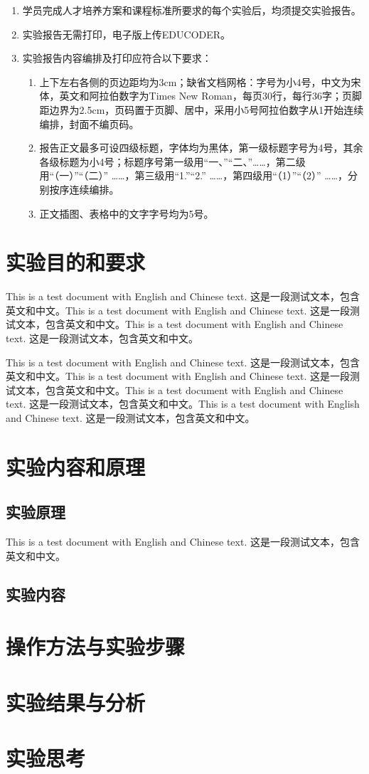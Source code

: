 \documentclass[a4paper,12pt]{article}
\begin{document}
\begin{enumerate}
\songti{}
\item 学员完成人才培养方案和课程标准所要求的每个实验后，均须提交实验报告。
\item 实验报告无需打印，电子版上传EDUCODER。
\item 实验报告内容编排及打印应符合以下要求：
    \begin{enumerate}
    \fangsong{}
    \item 上下左右各侧的页边距均为3cm；缺省文档网格：字号为小4号，中文为宋体，英文和阿拉伯数字为Times New Roman，每页30行，每行36字；页脚距边界为2.5cm，页码置于页脚、居中，采用小5号阿拉伯数字从1开始连续编排，封面不编页码。
    \item 报告正文最多可设四级标题，字体均为黑体，第一级标题字号为4号，其余各级标题为小4号；标题序号第一级用“一、”“二、”……，第二级用“（一）”“（二）” ……，第三级用“1.”“2.” ……，第四级用“（1）”“（2）” ……，分别按序连续编排。
    \item 正文插图、表格中的文字字号均为5号。
    \end{enumerate}
\end{enumerate}

\newpage

\section{实验目的和要求}
This is a test document with English and Chinese text. 这是一段测试文本，包含英文和中文。This is a test document with English and Chinese text. 这是一段测试文本，包含英文和中文。This is a test document with English and Chinese text. 这是一段测试文本，包含英文和中文。

This is a test document with English and Chinese text. 这是一段测试文本，包含英文和中文。This is a test document with English and Chinese text. 这是一段测试文本，包含英文和中文。This is a test document with English and Chinese text. 这是一段测试文本，包含英文和中文。This is a test document with English and Chinese text. 这是一段测试文本，包含英文和中文。

\section{实验内容和原理}
\subsection{实验原理}
This is a test document with English and Chinese text. 这是一段测试文本，包含英文和中文。
\subsection{实验内容}



\section{操作方法与实验步骤}


\section{实验结果与分析}


\section{实验思考}
\end{document}
